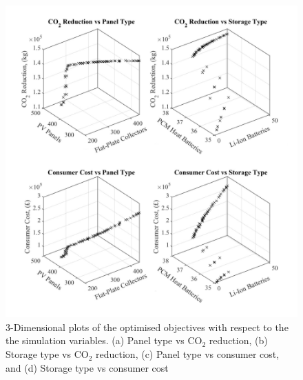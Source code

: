 \begin{figure}[H]
	\centering
    \includegraphics[width=\columnwidth]{Figures/RedAndCostVsPanelsAndStorage2.jpg}
    \caption{3-Dimensional plots of the optimised objectives with respect to the the simulation variables. (a) Panel type vs CO$_2$ reduction, (b) Storage type vs CO$_2$ reduction, (c) Panel type vs consumer cost, and (d) Storage type vs consumer cost}
    \label{fig:ObjectivesVsPanelsVsStorage2}
\end{figure}

